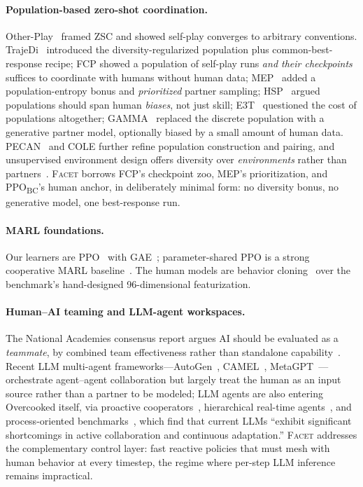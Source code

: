 \documentclass[11pt]{article}
\newcommand{\facet}{\textsc{Facet}}
\newcommand{\ppobc}{PPO\textsubscript{BC}}
\begin{document}
\paragraph{Population-based zero-shot coordination.}
Other-Play~\citep{hu2020otherplay} framed ZSC and showed self-play converges
to arbitrary conventions. TrajeDi~\citep{lupu2021trajectory} introduced the
diversity-regularized population plus common-best-response recipe; FCP
\citep{strouse2021collaborating} showed a population of self-play runs
\emph{and their checkpoints} suffices to coordinate with humans without human
data; MEP~\citep{zhao2023maximum} added a population-entropy bonus and
\emph{prioritized} partner sampling; HSP~\citep{yu2023hsp} argued populations
should span human \emph{biases}, not just skill; E3T~\citep{yan2023e3t}
questioned the cost of populations altogether; GAMMA~\citep{liang2024gamma}
replaced the discrete population with a generative partner model, optionally
biased by a small amount of human data. PECAN~\citep{lou2023pecan} and COLE
\citep{li2023cooperative} further refine population construction and
pairing, and unsupervised environment design offers diversity over
\emph{environments} rather than partners~\citep{you2025curriculum}. \facet{} borrows FCP's checkpoint zoo, MEP's prioritization, and
\ppobc{}'s human anchor, in deliberately minimal form: no diversity bonus,
no generative model, one best-response run.

\paragraph{MARL foundations.}
Our learners are PPO~\citep{schulman2017proximal} with
GAE~\citep{schulman2016gae}; parameter-shared PPO is a strong cooperative
MARL baseline~\citep{yu2022surprising}. The human models are behavior
cloning~\citep{pomerleau1991efficient,bain1995framework} over the benchmark's
hand-designed 96-dimensional featurization.

\paragraph{Human--AI teaming and LLM-agent workspaces.}
The National Academies consensus report argues AI should be evaluated as a
\emph{teammate}, by combined team effectiveness rather than standalone
capability~\citep{nationalacademies2022humanaiteaming}. Recent LLM
multi-agent frameworks---AutoGen~\citep{wu2024autogen},
CAMEL~\citep{li2023camel}, MetaGPT~\citep{hong2024metagpt}---orchestrate
agent--agent collaboration but largely treat the human as an input source
rather than a partner to be modeled; LLM agents are also entering Overcooked
itself, via proactive cooperators~\citep{zhang2024proagent}, hierarchical
real-time agents~\citep{liu2024hla}, and process-oriented
benchmarks~\citep{sun2025cooverc}, which find that current LLMs
``exhibit significant shortcomings in active collaboration and continuous
adaptation.'' \facet{} addresses the complementary control layer: fast
reactive policies that must mesh with human behavior at every timestep, the
regime where per-step LLM inference remains impractical.
\end{document}
